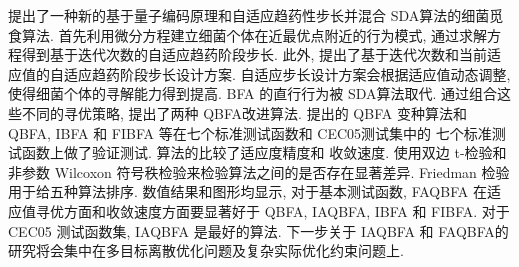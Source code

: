 提出了一种新的基于量子编码原理和自适应趋药性步长并混合 SDA算法的细菌觅食算法. 首先利用微分方程建立细菌个体在近最优点附近的行为模式, 通过求解方程得到基于迭代次数的自适应趋药阶段步长. 此外, 提出了基于迭代次数和当前适应值的自适应趋药阶段步长设计方案. 自适应步长设计方案会根据适应值动态调整, 使得细菌个体的寻解能力得到提高. BFA 的直行行为被 SDA算法取代. 通过组合这些不同的寻优策略, 提出了两种 QBFA改进算法. 提出的 QBFA 变种算法和 QBFA, IBFA 和 FIBFA 等在七个标准测试函数和 CEC05测试集中的 七个标准测试函数上做了验证测试. 算法的比较了适应度精度和 收敛速度. 使用双边 t-检验和非参数 Wilcoxon 符号秩检验来检验算法之间的是否存在显著差异. Friedman 检验用于给五种算法排序. 数值结果和图形均显示, 对于基本测试函数, FAQBFA 在适应值寻优方面和收敛速度方面要显著好于 QBFA, IAQBFA, IBFA 和 FIBFA. 对于 CEC05 测试函数集, IAQBFA 是最好的算法. 下一步关于 IAQBFA 和 FAQBFA的研究将会集中在多目标离散优化问题及复杂实际优化约束问题上.
